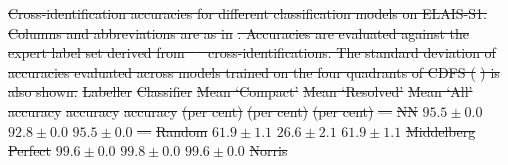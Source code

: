 \documentclass[11pt, a4paper]{book}
\providecommand{\DIFdeltex}[1]{{\protect\color{red}\sout{#1}}}                      %
\providecommand{\DIFdelFL}[1]{\DIFdel{#1}} %
\providecommand{\DIFdel}[1]{\texorpdfstring{\DIFdeltex{#1}}{}} %
\begin{document}
{%
\DIFdelFL{Cross-identification accuracies for different classification
    models on ELAIS-S1. Columns and abbreviations are as in
    }%
\DIFdelFL{. Accuracies are evaluated against the expert label
    set derived from \mbox{%
\citet{middelberg08} }\hspace{0pt}%
cross-identifications. The standard
    deviation of accuracies evaluated across models trained on the four
    quadrants of CDFS (}%
\DIFdelFL{) is also shown.}}
\DIFdelFL{Labeller }%
\DIFdelFL{Classifier }%
\DIFdelFL{Mean `Compact' }%
\DIFdelFL{Mean `Resolved' }%
\DIFdelFL{Mean `All'}%
\DIFdelFL{accuracy }%
\DIFdelFL{accuracy }%
\DIFdelFL{accuracy}%
\DIFdelFL{(per cent) }%
\DIFdelFL{(per cent) }%
\DIFdelFL{(per cent)}%
\DIFdelFL{---}%
\DIFdelFL{NN }%
\DIFdelFL{$95.5 \pm 0.0$ }%
\DIFdelFL{$92.8 \pm 0.0$ }%
\DIFdelFL{$95.5 \pm 0.0$}%
\DIFdelFL{---}%
\DIFdelFL{Random }%
\DIFdelFL{$61.9 \pm 1.1$ }%
\DIFdelFL{$26.6 \pm 2.1$ }%
\DIFdelFL{$61.9 \pm 1.1$}%
\DIFdelFL{Middelberg }%
\DIFdelFL{Perfect }%
\DIFdelFL{$99.6 \pm 0.0$ }%
\DIFdelFL{$99.8 \pm 0.0$ }%
\DIFdelFL{$99.6 \pm 0.0$}%
\DIFdelFL{Norris }%
\end{document}
